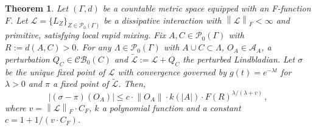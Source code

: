 \documentclass[11pt]{article}
\numberwithin{equation}{section}
\numberwithin{figure}{section}
\numberwithin{table}{section}
\theoremstyle{definition}
\theoremstyle{plain}
\newtheorem{thm}{Theorem}[section]
\theoremstyle{remark}
\newcommand{\Li}{\mathcal{L}}
\newcommand{\LL}{\widetilde{\Li}}
\newcommand{\norm}[1]{\left\lVert#1\right\rVert}
\newcommand{\normm}[2]{\left\lVert#1\right\rVert_{#2}}
\newcommand{\abs}[1]{\left \vert#1\right\vert}
\begin{document}
\medskip
\begin{thm}\label{thm:localPerturbation}
    Let $(\Gamma,d)$ be a countable metric space equipped with an F-function $F$. Let $\Li=\{L_Z\}_{Z\in \mathcal{P}_0(\Gamma)}$ be a dissipative interaction with $\normm{\Li}{F}<\infty$ and primitive, satisfying local rapid mixing. Fix $A,C\in \mathcal{P}_0(\Gamma)$ with $R:=d(A,C)>0$. For any $\Lambda\in  \mathcal{P}_0(\Gamma)$ with $A\cup C \subset \Lambda$, $O_A\in \mathcal{A}_A$, a perturbation $Q_C\in \mathcal{CB}_0(C)$ and $\LL:=\Li+Q_C$ the perturbed \textit{Lindbladian}.
Let $\sigma$ be the unique fixed point of $\Li$ with convergence governed by $g(t)=e^{-\lambda t}$ for $\lambda >0$ and $\pi$ a fixed point of $\LL$.
Then,
    \begin{equation}\label{eq:diff_fixed_points_Lindbladians}
        \abs{(\sigma-\pi)(O_A)}\leq c\cdot \norm{O_A} \cdot k(\abs{A})\cdot F(R)^{\lambda/(\lambda +v)} \, ,
    \end{equation}
    where $v=\normm{\mathcal{L}}{F}\cdot C_F$, $k$ a polynomial function and a constant $c=1+1/(v\cdot C_F)$.
\end{thm}
\end{document}
